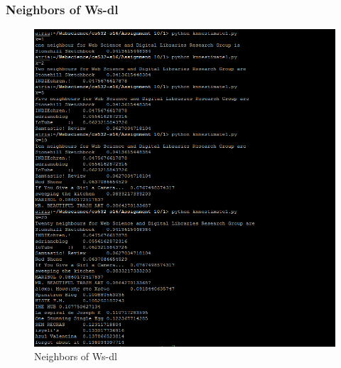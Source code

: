 \subsubsection{Neighbors of Ws-dl}
\begin{figure}[ht]    
    \begin{center}
        \includegraphics[scale=0.7]{wsdlneighbours.png}
        \caption{Neighbors of Ws-dl}
        \label{Sample3}
    \end{center}
\end{figure}
\newpage

